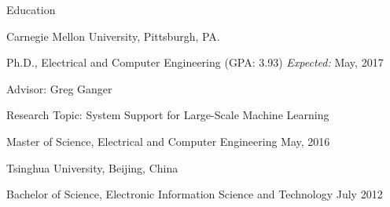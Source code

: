 \documentclass{resume} %
\begin{document}





\vspace{-.2in}

\begin{rSection}{Education}

\begin{rSubsection}{\hspace{-1em} Carnegie Mellon University, Pittsburgh, PA.}{}{}{}
\vspace{-0.3em}
\item[] \hspace{-2em} Ph.D., Electrical and Computer Engineering (GPA: 3.93) \hfill \emph{Expected:} May, 2017
\item Advisor: Greg Ganger
\item Research Topic: System Support for Large-Scale Machine Learning
\item[] \hspace{-2em} Master of Science, Electrical and Computer Engineering \hfill May, 2016
\end{rSubsection}
\vspace{-.1in}

\begin{rSubsection}{\hspace{-1em} Tsinghua University, Beijing, China}{}{}{}
\vspace{-0.3em}
\item[] \hspace{-2em} Bachelor of Science, Electronic Information Science and Technology \hfill July 2012
\end{rSubsection}
\vspace{-.1in}

\end{rSection}
\vspace{-.05in}
\end{document}
